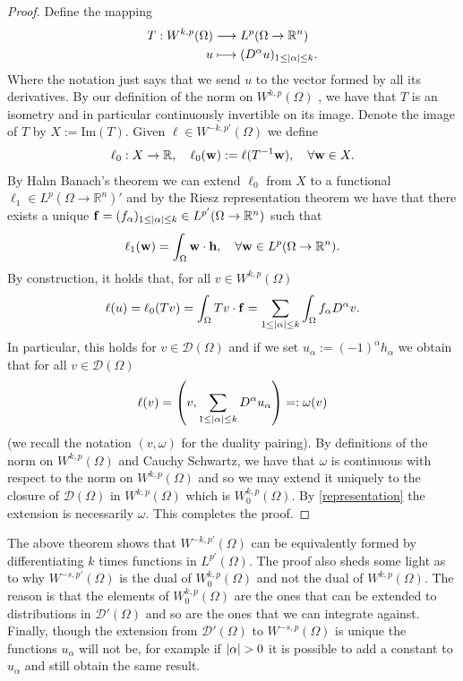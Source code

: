 \documentclass[
    a4paper,
    DIV=14,
    abstract=true,
    numbers=noenddot
]
{scrartcl}
\theoremstyle{definition}
\newcommand{\rm}[1]{\mathrm{#1}}
\newcommand{\R}{\mathbb{R}}
\newcommand{\Dd}{\mathcal{D}}
\begin{document}
\begin{proof}
    Define the mapping
    \begin{align*}
        T: W^{k,p}(\Omega ) & \longrightarrow L^p(\Omega \to \R^n)                \\
        u                   & \longmapsto(D^\alpha u)_{1 \leq\abs{\alpha}\leq k}.
    \end{align*}
    Where the notation just says that we send $u$ to the vector formed by all its derivatives. By our definition of the norm on $W^{k,p}(\Omega )$ , we have that $T$ is an isometry and in particular continuously invertible on its image. Denote the image of $T$ by $X:=\rm{Im}(T)$. Given $\ell \in W^{-k,p'}(\Omega )$ we define
    \begin{align*}
        \ell_0: X \to \R, \quad \ell_0(\vb{w}):= \ell(T^{-1}\vb{w}), \quad \forall \vb{w} \in X.
    \end{align*}
    By Hahn Banach's theorem we can extend $\ell_0$ from $X$ to a functional $\ell_1 \in  L^p(\Omega \to \R^n)'$ and by the Riesz representation theorem we have that there exists a unique $\vb{f}=(f_\alpha)_{1\leq \abs{\alpha}\leq k }\in L^{p'}(\Omega \to \R^n)$ such that
    \begin{align*}
        \ell_1(\vb{w})=\int_{\Omega}\vb{w}\cdot \vb{h}, \quad \forall \vb{w} \in L^p(\Omega \to \R^n).
    \end{align*}
    By construction, it holds that, for all $v \in W^{k,p}(\Omega )$
    \begin{align*}
        \ell(u)=\ell_0(Tv)=\int_{\Omega}Tv\cdot \vb{f}=\sum_{1\leq\left| \alpha \right|\leq k}\int_{\Omega}f_\alpha D^\alpha v .
    \end{align*}
    In particular, this holds for $v \in \Dd(\Omega )$ and if we set $u_\alpha:=(-1)^\alpha h_\alpha$ we obtain that for all $v \in \Dd(\Omega )$
    \begin{align}\label{representation}
        \ell(v)=\left(v,\sum_{1\leq\left| \alpha \right|\leq k} D^\alpha u_\alpha\right)=: \omega(v)
    \end{align}
    (we recall the notation $(v,\omega)$ for the duality pairing). By definitions of the norm on $W^{k,p}(\Omega )$ and Cauchy Schwartz, we have that $\omega$ is continuous with respect to the norm on $W^{k,p}(\Omega )$ and so we may extend it uniquely to the closure of $\Dd(\Omega )$ in $W^{k,p}(\Omega )$ which is $W^{k,p}_0(\Omega )$. By \eqref{representation} the extension is necessarily $\omega$. This completes the proof.
\end{proof}
The above theorem shows that $W^{-k,p'}(\Omega )$ can be equivalently formed by differentiating $k$ times functions in $L^{p'}(\Omega )$. The proof also sheds some light as to why $W^{-s,p'}(\Omega )$ is the dual of $W^{k,p}_0(\Omega )$ and not the dual of $W^{k,p}(\Omega )$. The reason is that the elements of $W^{k,p}_0(\Omega )$ are the ones that can be extended to distributions in $\Dd'(\Omega )$ and so are the ones that we can integrate against. Finally, though the extension from $\Dd'(\Omega )$ to $W^{-s,p}(\Omega )$ is unique the functions $u_\alpha$ will not be, for example if $\abs{\alpha}>0$ it is possible to add a constant to $u_\alpha$ and still obtain the same result.
\end{document}
